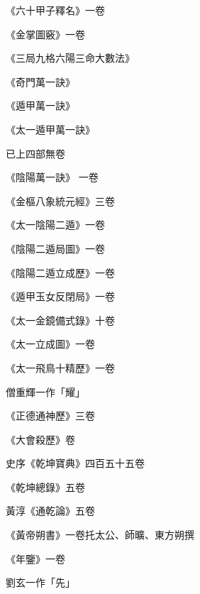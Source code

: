 \begin{pinyinscope}
 《六十甲子釋名》一卷



 《金掌圖竅》一卷



 《三局九格六陽三命大數法》



 《奇門萬一訣》



 《遁甲萬一訣》



 《太一遁甲萬一訣》



 已上四部無卷



 《陰陽萬一訣》
 一卷



 《金樞八象統元經》三卷



 《太一陰陽二遁》一卷



 《陰陽二遁局圖》一卷



 《陰陽二遁立成歷》一卷



 《遁甲玉女反閉局》一卷



 《太一金鏡備式錄》十卷



 《太一立成圖》一卷



 《太一飛鳥十精歷》一卷



 僧重輝一作「耀」



 《正德通神歷》三卷



 《大會殺歷》卷



 史序《乾坤寶典》四百五十五卷



 《乾坤總錄》五卷



 黃淳《通乾論》五卷



 《黃帝朔書》一卷托太公、師曠、東方朔撰



 《年鑒》一卷



 劉玄一作「先」




\end{pinyinscope}
